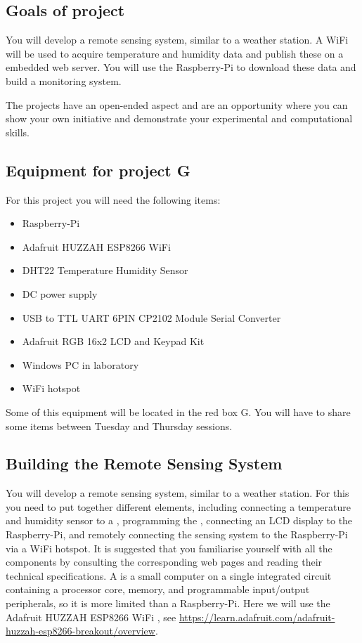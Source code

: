 \subsection{Goals of project}

You will develop a remote sensing system, similar to a weather station.
A WiFi \microcontroller will be used to acquire temperature and humidity data
and publish these on a embedded web server. You will use the Raspberry-Pi to
download these data and build a monitoring system.


The projects have an open-ended aspect and are an opportunity where you can show your own initiative and demonstrate your experimental and computational skills. 


\subsection{Equipment for project G}

For this project you will need the following items:
\begin{itemize}
\item Raspberry-Pi
\item Adafruit HUZZAH ESP8266 WiFi  \microcontroller
\item DHT22 Temperature Humidity Sensor 
\item DC power supply
\item USB  to TTL UART 6PIN CP2102 Module Serial Converter
\item Adafruit RGB 16x2 LCD and Keypad Kit 
\item Windows PC in laboratory
\item WiFi hotspot 
\end{itemize}
Some of this equipment will be located in the red box G. You will have to share some items between Tuesday and Thursday sessions. 


\subsection{Building the Remote Sensing System}

You will develop a remote sensing system, similar to a weather station.
For this you need to put together different elements, including 
connecting a temperature and humidity sensor to a \microcontroller, 
programming the \microcontroller,
connecting an LCD display to the Raspberry-Pi,
and remotely connecting the sensing system to the Raspberry-Pi via
a WiFi hotspot. It is suggested that you familiarise yourself with all the components
by consulting the corresponding web pages and reading their  technical specifications.
A \microcontroller is a small computer on a single integrated circuit containing a processor core, memory, and programmable input/output peripherals,  so it is more limited than a 
Raspberry-Pi. Here we will use the Adafruit HUZZAH ESP8266 WiFi  \microcontroller,
see \url{https://learn.adafruit.com/adafruit-huzzah-esp8266-breakout/overview}.

